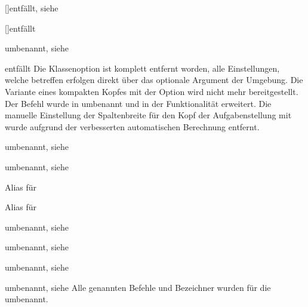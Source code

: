 \begin{Declaration}{[\PSet]}{entfällt, siehe }
\begin{Declaration}{[\PBoolean]}{entfällt}
\begin{Declaration}{}{%
  umbenannt, siehe %
}
\begin{Declaration}{}{entfällt}
\printdeclarationlist*%
%
Die Klassenoption  ist komplett entfernt worden, alle 
Einstellungen, welche  betreffen erfolgen direkt über das 
optionale Argument der Umgebung. Die Variante eines kompakten Kopfes mit der 
Option  wird nicht mehr bereitgestellt. Der Befehl 
 wurde in  umbenannt und in der Funktionalität 
erweitert. Die manuelle Einstellung der Spaltenbreite für den Kopf der 
Aufgabenstellung mit  wurde aufgrund der verbesserten 
automatischen Berechnung entfernt.
\end{Declaration}
\end{Declaration}
\end{Declaration}
\end{Declaration}

\begin{Declaration}{}{%
  umbenannt, siehe %
}
\begin{Declaration}{}{umbenannt, siehe }
\begin{Declaration}{}{%
  Alias für %
}
\begin{Declaration}{}{%
  Alias für %
}
\begin{Declaration}{}{umbenannt, siehe }
\begin{Declaration}{}{umbenannt, siehe }
\begin{Declaration}{}{umbenannt, siehe }
\begin{Declaration}{}{%
  umbenannt, siehe %
}
\printdeclarationlist*%
%
Alle genannten Befehle und Bezeichner wurden für die \taskname{} umbenannt.
\end{Declaration}
\end{Declaration}
\end{Declaration}
\end{Declaration}
\end{Declaration}
\end{Declaration}
\end{Declaration}
\end{Declaration}

